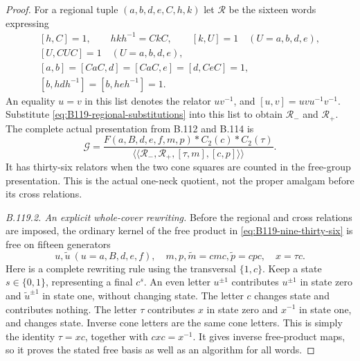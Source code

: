 \begin{proof}
For a regional tuple $(a,b,d,e,C,h,k)$ let $\mathscr R$ be the
sixteen words expressing
\begin{equation}\label{eq:B119-sixteen-scheme}
 \begin{gathered}
 [h,C]=1,\qquad hkh^{-1}=CkC,\qquad
 [k,U]=1\quad(U=a,b,d,e),\\
 [U,CUC]=1\quad(U=a,b,d,e),\\
 [a,b]=[CaC,d]=[CaC,e]=[d,CeC]=1,\\
 [b,hdh^{-1}]=[b,heh^{-1}]=1.
 \end{gathered}
\end{equation}
An equality $u=v$ in this list denotes the relator $uv^{-1}$,
and $[u,v]=uvu^{-1}v^{-1}$. Substitute
\eqref{eq:B119-regional-substitutions} into this list to obtain
$\mathscr R_-$ and $\mathscr R_+$. The complete actual presentation
from B.112 and B.114 is
\begin{equation}\label{eq:B119-nine-thirty-six}
 \mathcal G=
 \frac{F(a,B,d,e,f,m,p)*C_2(c)*C_2(\tau)}
 {\langle\!\langle\mathscr R_-,\mathscr R_+,
                    [\tau,m],[c,p]\rangle\!\rangle}.
\end{equation}
It has thirty-six relators when the two cone squares are counted in
the free-group presentation. This is the actual one-neck quotient,
not the proper amalgam before its cross relations.

\emph{B.119.2. An explicit whole-cover rewriting.}
Before the regional and cross relations are imposed, the ordinary
kernel of the free product in \eqref{eq:B119-nine-thirty-six} is
free on fifteen generators
\[
 u,\widetilde u\ (u=a,B,d,e,f),\quad
 m,p,\widetilde m=cmc,\widetilde p=cpc,\quad x=\tau c.
\]
Here is a complete rewriting rule using the transversal $\{1,c\}$.
Keep a state $s\in\{0,1\}$, representing a final $c^s$. An even
letter $u^{\pm1}$ contributes $u^{\pm1}$ in state zero and
$\widetilde u^{\pm1}$ in state one, without changing state.
The letter $c$ changes state and contributes nothing. The letter
$\tau$ contributes $x$ in state zero and $x^{-1}$ in state one,
and changes state. Inverse cone letters are the same cone letters.
This is simply the identity $\tau=xc$, together with
$cxc=x^{-1}$. It gives inverse free-product maps, so it proves
the stated free basis as well as an algorithm for all words.


\end{proof}
